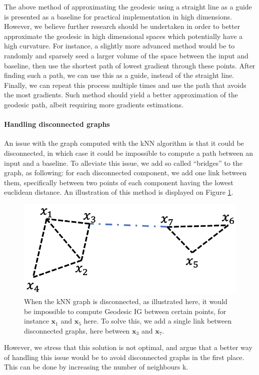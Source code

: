 The above method of approximating the geodesic using a straight line as a guide is presented as a baseline for practical implementation in high dimensions. However, we believe further research should be undertaken in order to better approximate the geodesic in high dimensional spaces which potentially have a high curvature. For instance, a slightly more advanced method would be to randomly and sparsely seed a larger volume of the space between the input and baseline, then use the shortest path of lowest gradient through these points. After finding such a path, we can use this as a guide, instead of the straight line. Finally, we can repeat this process multiple times and use the path that avoids the most gradients. Such method should yield a better approximation of the geodesic path, albeit requiring more gradients estimations.

\paragraph{Handling disconnected graphs}

An issue with the graph computed with the kNN algorithm is that it could be disconnected, in which case it could be impossible to compute a path between an input and a baseline. To alleviate this issue, we add so called ``bridges'' to the graph, as following: for each disconnected component, we add one link between them, specifically between two points of each component having the lowest euclidean distance. An illustration of this method is displayed on Figure \ref{fig:bridge}.

\begin{figure}[ht]
\vskip 0.2in
\begin{center}
\centerline{\includegraphics[width=0.8\columnwidth]{figures/bridge.png}}
\caption{When the kNN graph is disconnected, as illustrated here, it would be impossible to compute Geodesic IG between certain points, for instance $\textbf{x}_1$ and $\textbf{x}_5$ here. To solve this, we add a single link between disconnected graphs, here between $\textbf{x}_3$ and $\textbf{x}_7$.}
\label{fig:bridge}
\end{center}
\vskip -0.2in
\end{figure}

However, we stress that this solution is not optimal, and argue that a better way of handling this issue would be to avoid disconnected graphs in the first place. This can be done by increasing the number of neighbours k.